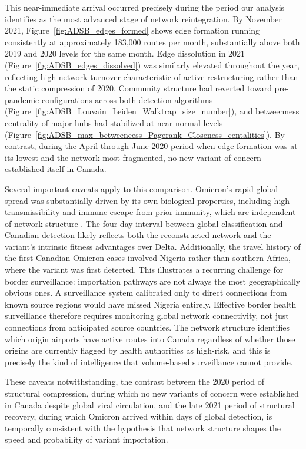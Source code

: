 \documentclass{elsarticle}
\begin{document}
This near-immediate arrival occurred precisely during the period our analysis identifies as the most advanced stage of network reintegration. By November 2021, Figure~\ref{fig:ADSB_edges_formed} shows edge formation running consistently at approximately 183,000 routes per month, substantially above both 2019 and 2020 levels for the same month. Edge dissolution in 2021 (Figure~\ref{fig:ADSB_edges_dissolved}) was similarly elevated throughout the year, reflecting high network turnover characteristic of active restructuring rather than the static compression of 2020. Community structure had reverted toward pre-pandemic configurations across both detection algorithms (Figure~\ref{fig:ADSB_Louvain_Leiden_Walktrap_size_number}), and betweenness centrality of major hubs had stabilized at near-normal levels (Figure~\ref{fig:ADSB_max_betweeneess_Pagerank_Closeness_centalities}). By contrast, during the April through June 2020 period when edge formation was at its lowest and the network most fragmented, no new variant of concern established itself in Canada.

Several important caveats apply to this comparison. Omicron's rapid global spread was substantially driven by its own biological properties, including high transmissibility and immune escape from prior immunity, which are independent of network structure \cite{omicron_biology_2021}. The four-day interval between global classification and Canadian detection likely reflects both the reconstructed network and the variant's intrinsic fitness advantages over Delta. Additionally, the travel history of the first Canadian Omicron cases involved Nigeria rather than southern Africa, where the variant was first detected. This illustrates a recurring challenge for border surveillance: importation pathways are not always the most geographically obvious ones. A surveillance system calibrated only to direct connections from known source regions would have missed Nigeria entirely. Effective border health surveillance therefore requires monitoring global network connectivity, not just connections from anticipated source countries. The network structure identifies which origin airports have active routes into Canada regardless of whether those origins are currently flagged by health authorities as high-risk, and this is precisely the kind of intelligence that volume-based surveillance cannot provide.

These caveats notwithstanding, the contrast between the 2020 period of structural compression, during which no new variants of concern were established in Canada despite global viral circulation, and the late 2021 period of structural recovery, during which Omicron arrived within days of global detection, is temporally consistent with the hypothesis that network structure shapes the speed and probability of variant importation.
\end{document}
